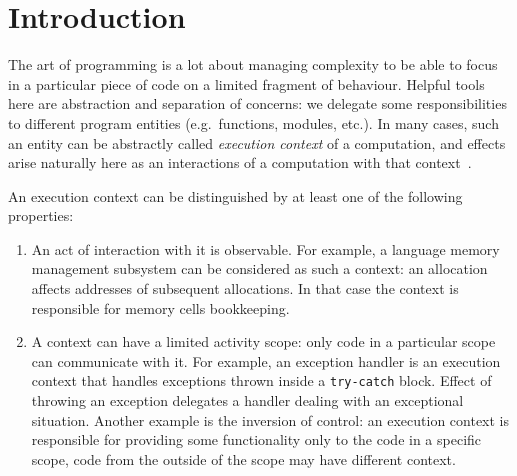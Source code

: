 \documentclass[acmsmall]{acmart}
\begin{document}



\maketitle


\section{Introduction} \label{sec:intro}


The art of programming is a lot about managing complexity to be able to focus in a particular piece of code on a limited fragment of behaviour.
Helpful tools here are abstraction and separation of concerns: we delegate some responsibilities to different program entities (e.g.\ functions, modules, etc.).
In many cases, such an entity can be abstractly called \textit{execution context} of a computation, and effects arise naturally here as an interactions of a computation with that context~\cite{kiselyov2013extensible}.

An execution context can be distinguished by at least one of the following properties:
\begin{enumerate}
    \item An act of interaction with it is observable.
    For example, a language memory management subsystem can be considered as such a context: an allocation affects addresses of subsequent allocations.
    In that case the context is responsible for memory cells bookkeeping.
    \item A context can have a limited activity scope: only code in a particular scope can communicate with it.
    For example, an exception handler is an execution context that handles exceptions thrown inside a \texttt{try-catch} block.
    Effect of throwing an exception delegates a handler dealing with an exceptional situation.
    Another example is the inversion of control: an execution context is responsible for providing some functionality only to the code in a specific scope, code from the outside of the scope may have different context.
\end{enumerate}
\end{document}
